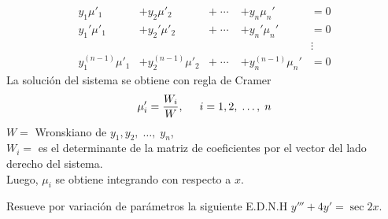 \documentclass{beamer}
\begin{document}
\begin{frame}[t]
	\begin{block}{}
		\vspace{-5mm}
			\begin{align*}
				y_1 \mu ' _1            &+          y_2 \mu ' _2            &+     \;\cdots\;    &+     y_n \mu _n'           &=    0 \\
				y_1' \mu ' _1           &+          y_2' \mu ' _2           &+     \;\cdots\;    &+     y_n' \mu _n'          &=    0 \\
				& & & &\vdots \\
				y_1^{(n-1)} \mu ' _1    &+          y_2^{(n-1)} \mu ' _2    &+     \;\cdots\;    &+     y_n^{(n-1)} \mu _n'   &=    0
			\end{align*}
			La solución del sistema se obtiene con regla de Cramer
			\[
				\mu _i' = \dfrac{W_i}{W}, \hspace{5mm} i=1,2, \;\ldots,\; n
			\]
			\(W =\) Wronskiano de \(y_1, y_2, \;\ldots,\; y_n\), \\[2mm]
			\(W_i=\) es el determinante de la matriz de coeficientes por el vector del lado derecho del sistema. \\[2mm]
			Luego, \(\mu _i\) se obtiene integrando con respecto a \(x\).
	\end{block}
\end{frame}

\begin{frame}[t]
	\begin{example}
		Resueve por variación de parámetros la siguiente E.D.N.H \(y''' +4y' = \sec 2x\).
	\end{example}
\end{frame}
\end{document}
